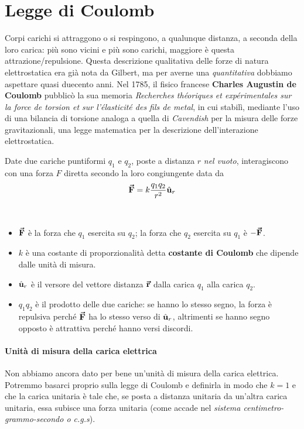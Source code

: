 \section{Legge di Coulomb}
Corpi carichi si attraggono o si respingono, a qualunque distanza, a seconda della loro carica: più sono vicini e più sono carichi, maggiore è questa attrazione/repulsione. Questa descrizione qualitativa delle forze di natura elettrostatica era già nota da Gilbert, ma per averne una \textit{quantitativa} dobbiamo aspettare quasi duecento anni.
Nel 1785, il fisico francese \textbf{Charles Augustin de Coulomb} pubblicò la sua memoria \textit{Recherches théoriques et expérimentales sur la force de torsion et sur l'élasticité des fils de metal}, in cui stabilì, mediante l'uso di una bilancia di torsione analoga a quella di \textit{Cavendish} per la misura delle forze gravitazionali, una legge matematica per la descrizione dell'interazione elettrostatica.
\begin{define}
	Date due cariche puntiformi $q_1$ e $q_2$, poste a distanza $r$ \textit{nel vuoto}, interagiscono con una forza $F$ diretta secondo la loro congiungente data da
	\begin{equation}
		\vb*{\va{F}}=k\frac{q_1q_2}{r^2}\hat{\mathbf{u}}_r\label{leggeCoulomb}
	\end{equation}
\end{define}
\begin{observes}~
	\begin{itemize}
		\item $\vb*{\va{F}}$ è la forza che $q_1$ esercita su $q_2$; la forza che $q_2$ esercita su $q_1$ è $-\vb*{\va{F}}$.
		\item $k$ è una costante di proporzionalità detta \textbf{costante di Coulomb} che dipende dalle unità di misura.
		\item $\hat{\mathbf{u}}_r$ è il versore del vettore distanza $\vb*{\va{r}}$ dalla carica $q_1$ alla carica $q_2$.
		\item $q_1q_2$ è il prodotto delle due cariche: se hanno lo stesso segno, la forza è repulsiva perché $\vb*{\va{F}}$ ha lo stesso verso di $\hat{\mathbf{u}}_r$, altrimenti se hanno segno opposto è attrattiva perché hanno versi discordi.
	\end{itemize}
\end{observes}
\paragraph{Unità di misura della carica elettrica}
Non abbiamo ancora dato per bene un'unità di misura della carica elettrica. Potremmo basarci proprio sulla legge di Coulomb e definirla in modo che $k=1$ e che la carica unitaria è tale che, se posta a distanza unitaria da un'altra carica unitaria, essa subisce una forza unitaria (come accade nel \textit{sistema centimetro-grammo-secondo o c.g.s}).  


